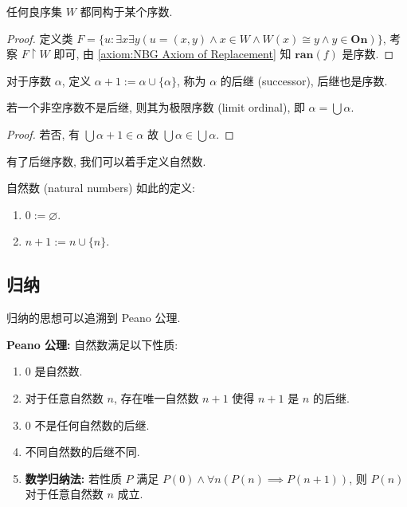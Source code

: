 \begin{lemma}
    任何良序集 \(W\) 都同构于某个序数.

    \begin{proof}
        定义类 \(F = \{u : \exists x \exists y(u=(x,y) \land x \in W \land W(x) \cong y \land y \in \mathbf{On})\}\), 
        考察 \(F \upharpoonright W\) 即可, 由 \ref{axiom:NBG Axiom of Replacement} 知 \(\mathbf{ran} (f)\) 是序数.
    \end{proof}
\end{lemma}

\begin{definition}
    对于序数 \(\alpha\), 定义 \(\alpha + 1 := \alpha \cup \{\alpha\}\), 称为 \(\alpha\) 的后继 (successor), 后继也是序数.
\end{definition}

\begin{corollary}
    \label{corollary:ordinal numbers are successors or limits}
    若一个非空序数不是后继, 则其为极限序数 (limit ordinal), 即 \(\alpha = \bigcup \alpha\).

    \begin{proof}
        若否, 有 \(\bigcup \alpha + 1 \in \alpha\) 故 \(\bigcup \alpha \in \bigcup \alpha\).
    \end{proof}
\end{corollary}

有了后继序数, 我们可以着手定义自然数.

\begin{definition}
    \label{definition:natural numbers}
    自然数 (natural numbers) 如此的定义:
    \begin{enumerate}
        \item \(0 := \varnothing\).
        \item \(n + 1 := n \cup \{n\}\).
    \end{enumerate}
\end{definition}

\subsection{归纳}

归纳的思想可以追溯到 Peano 公理.

\begin{example}
    \textbf{Peano 公理:} 自然数满足以下性质:
    \begin{enumerate}
        \item \(0\) 是自然数.
        \item 对于任意自然数 \(n\), 存在唯一自然数 \(n+1\) 使得 \(n+1\) 是 \(n\) 的后继.
        \item \(0\) 不是任何自然数的后继.
        \item 不同自然数的后继不同.
        \item \textbf{数学归纳法:} 若性质 \(P\) 满足 \(P(0) \land \forall n (P(n) \implies P(n+1))\), 则 \(P(n)\) 对于任意自然数 \(n\) 成立. 
    \end{enumerate}
\end{example}

